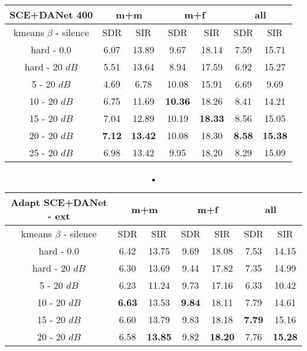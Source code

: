 \documentclass[master,final,11pt]{iscs-thesis}
\begin{document}
\begin{table}[h]
\centering
\begin{tabular}{c|c|c|c|c|c|c}
SCE+DANet 400 & \multicolumn{2}{c|}{m+m} & \multicolumn{2}{c|}{m+f} & \multicolumn{2}{c}{all} \\ 
\hline 
kmeans $\beta$ - silence & SDR & SIR & SDR & SIR & SDR & SIR \\ 
\hline
hard - 0.0  & 6.07 & 13.89 & 9.67 & 18.14 & 7.59 & 15.71 \\ 
hard - 20 $dB$  & 5.51 & 13.64 & 8.94 & 17.59 & 6.92 & 15.27 \\
\hline
\hline
5 - 20 $dB$  & 4.69 & 6.78 & 10.08 & 15.91 & 6.69 & 9.69 \\ 
10 - 20 $dB$  & 6.75 & 11.69 & \cellcolor{green}\textbf{10.36} & \cellcolor{green}18.26  & 8.41 & 14.21 \\ 
15 - 20 $dB$ & 7.04 & 12.89 & 10.19 & \textbf{18.33} & 8.56 & 15.05 \\ 
20 - 20 $dB$ & \cellcolor{green}\textbf{7.12} & \cellcolor{green}\textbf{13.42} & 10.08 & 18.30 & \cellcolor{green}\textbf{8.58} & \cellcolor{green}\textbf{15.38} \\ 
25 - 20 $dB$ & 6.98 & 13.42 & 9.95 & 18.20 & 8.29 & 15.09 \\ 
\end{tabular}
\captionsetup{justification=centering}
\caption{}
\label{table:SCEDANET400}
\end{table}

\begin{table}[h]
\centering
\begin{tabular}{c|c|c|c|c|c|c}
Adapt SCE+DANet - ext & \multicolumn{2}{c|}{m+m} & \multicolumn{2}{c|}{m+f} & \multicolumn{2}{c}{all} \\ 
\hline 
kmeans $\beta$ - silence & SDR & SIR & SDR & SIR & SDR & SIR \\ 
\hline
hard - 0.0  & 6.42 & 13.75 & 9.69 & 18.08 & 7.53 & 14.15 \\ 
hard - 20 $dB$  & 6.30 & 13.69 & 9.44 & 17.82 & 7.35 & 14.99 \\
\hline
\hline
5 - 20 $dB$  & 6.23 & 11.24 & 9.73 & 17.16 & 6.33 & 10.42 \\ 
10 - 20 $dB$  & \cellcolor{green}\textbf{6.63} & \cellcolor{green}13.53 & \cellcolor{green}\textbf{9.84} & \cellcolor{green}18.11 & 7.79 & 14.61 \\ 
15 - 20 $dB$ & 6.60 & 13.79 & 9.83 & 18.18 & \cellcolor{green}\textbf{7.79} & \cellcolor{green}15.16 \\ 
20 - 20 $dB$ & 6.58 & \textbf{13.85} & 9.82 & \textbf{18.20} & 7.76 & \textbf{15.28} \\ 
\end{tabular}
\caption{•}
\label{table:AdaptSCEDANET400}
\end{table}
\end{document}
